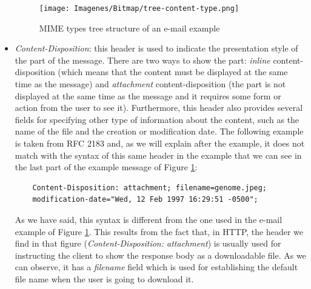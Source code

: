 \begin{itemize}
	\begin{figure}[t]
		\centering%
		\centerline{\texttt{[image: Imagenes/Bitmap/tree-content-type.png]}}%
		\caption{MIME types tree structure of an e-mail example}%
		\label{fig:content-type}
	\end{figure}
	\item\textit{Content-Disposition}: this header is used to indicate the presentation style of the part of the message. There are two ways to show the part: \textit{inline} content-disposition (which means that the content must be displayed at the same time as the message) and \textit{attachment} content-disposition (the part is not displayed at the same time as the message and it requires some form or action from the user to see it). Furthermore, this header also provides several fields for specifying other type of information about the content, such as the name of the file and the creation or modification date. The following example is taken from RFC 2183 \citep{rfc2183} and, as we will explain after the example, it does not match with the syntax of this same header in the example that we can see in the last part of the example message of Figure \ref{fig:content-type}:
	\begin{lstlisting}
	Content-Disposition: attachment; filename=genome.jpeg;
	modification-date="Wed, 12 Feb 1997 16:29:51 -0500";
	\end{lstlisting}
	As we have said, this syntax is different from the one used in the e-mail example of Figure \ref{fig:content-type}. This results from the fact that, in HTTP, the header we find in that figure (\textit{Content-Disposition: attachment}) is usually used for instructing the client to show the response body as a downloadable file. As we can observe, it has a \textit{filename} field which is used for establishing the default file name when the user is going to download it.
	

\end{itemize}

